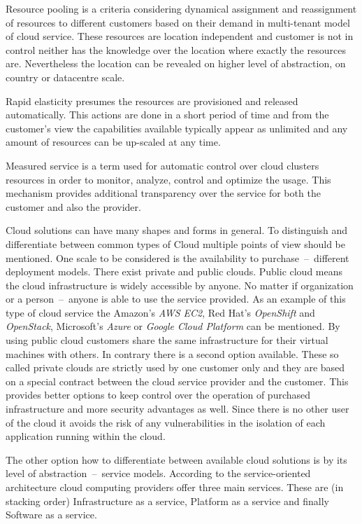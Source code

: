 Resource pooling is a criteria considering dynamical assignment and reassignment of resources to different customers based on their demand in multi-tenant model of cloud service. These resources are location independent and customer is not in control neither has the knowledge over the location where exactly the resources are. Nevertheless the location can be revealed on higher level of abstraction, on country or datacentre scale.

Rapid elasticity presumes the resources are provisioned and released automatically. This actions are done in a short period of time and from the customer's view the capabilities available typically appear as unlimited and any amount of resources can be up-scaled at any time.

Measured service is a term used for automatic control over cloud clusters resources in order to monitor, analyze, control and optimize the usage. This mechanism provides additional transparency over the service for both the customer and also the provider.

Cloud solutions can have many shapes and forms in general. To distinguish and differentiate between common types of Cloud multiple points of view should be mentioned. One scale to be considered is the availability to purchase \,--\, different deployment models. There exist private and public clouds. Public cloud means the cloud infrastructure is widely accessible by anyone. No matter if organization or a person \,--\, anyone is able to use the service provided. As an example of this type of cloud service the Amazon's \emph{AWS EC2}, Red Hat's \emph{OpenShift} and \emph{OpenStack}, Microsoft's \emph{Azure} or \emph{Google Cloud Platform} can be mentioned. By using public cloud customers share the same infrastructure for their virtual machines with others. In contrary there is a second option available. These so called private clouds are strictly used by one customer only and they are based on a special contract between the cloud service provider and the customer. This provides better options to keep control over the operation of purchased infrastructure and more security advantages as well. Since there is no other user of the cloud it avoids the risk of any vulnerabilities in the isolation of each application running within the cloud.

The other option how to differentiate between available cloud solutions is by its level of abstraction \,--\, service models. According to the service-oriented architecture cloud computing providers offer three main services. These are (in stacking order) Infrastructure as a service, Platform as a service and finally Software as a service.

